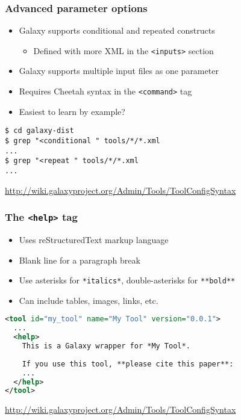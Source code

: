 \documentclass[table]{beamer}
\begin{document}
\begin{frame}[fragile]
\frametitle{Advanced parameter options}
\begin{itemize}
\item Galaxy supports conditional and repeated constructs
    \begin{itemize}
    \item Defined with more XML in the \texttt{<inputs>} section
    \end{itemize}
\item Galaxy supports multiple input files as one parameter
\item Requires Cheetah syntax in the \texttt{<command>} tag
\item Easiest to learn by example?
\end{itemize}
\vspace{3mm}
\begin{lstlisting}
$ cd galaxy-dist
$ grep "<conditional " tools/*/*.xml
...
$ grep "<repeat " tools/*/*.xml
...
\end{lstlisting}
\vspace{-3mm}
{\scriptsize \url{http://wiki.galaxyproject.org/Admin/Tools/ToolConfigSyntax}}
\end{frame}

\begin{frame}[fragile]
\frametitle{The \texttt{<help>} tag}
\begin{itemize}
\item Uses reStructuredText markup language
\item Blank line for a paragraph break
\item Use asterisks for \texttt{*italics*}, double-asterisks for \texttt{**bold**}
\item Can include tables, images, links, etc.
\end{itemize}
\vspace{3mm}
{\scriptsize
\begin{lstlisting}[language=xml]
<tool id="my_tool" name="My Tool" version="0.0.1">
  ...
  <help>
    This is a Galaxy wrapper for *My Tool*.
    
    If you use this tool, **please cite this paper**:
    ...
  </help>
</tool>
\end{lstlisting}
} %
\vspace{-3mm}
{\scriptsize \url{http://wiki.galaxyproject.org/Admin/Tools/ToolConfigSyntax}}
\end{frame}
\end{document}

